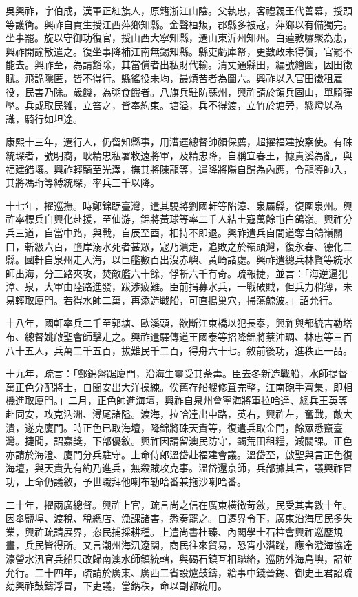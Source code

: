 \begin{pinyinscope}
吳興祚，字伯成，漢軍正紅旗人，原籍浙江山陰。父執忠，客禮親王代善幕，授頭等護衛。興祚自貢生授江西萍鄉知縣。金聲桓叛，郡縣多被寇，萍鄉以有備獨完。坐事罷。旋以守御功復官，授山西大寧知縣，遷山東沂州知州。白蓮教嘯聚為患，興祚開諭散遣之。復坐事降補江南無錫知縣。縣吏虧庫帑，更數政未得償，官罷不能去。興祚至，為請豁除，其當償者出私財代輸。清丈通縣田，編號繪圖，因田徵賦。飛詭隱匿，皆不得行。縣徭役未均，最煩苦者為圖六。興祚以入官田徵租雇役，民害乃除。歲饑，為粥食餓者。八旗兵駐防蘇州，興祚請於領兵固山，單騎彈壓。兵或取民雞，立笞之，皆奉約束。塘溢，兵不得渡，立竹於塘旁，懸燈以為識，騎行如坦途。

康熙十三年，遷行人，仍留知縣事，用漕運總督帥顏保薦，超擢福建按察使。有硃統琛者，號明裔，耿精忠私署敉遠將軍，及精忠降，自稱宜春王，據貴溪為亂，與福建錯壤。興祚輕騎至光澤，撫其將陳龍等，遣降將陽自歸為內應，令龍導師入，其將馮珩等縛統琛，率兵三千以降。

十七年，擢巡撫。時鄭錦踞臺灣，遣其驍將劉國軒等陷漳、泉屬縣，復圍泉州。興祚率標兵自興化赴援，至仙游，錦將黃球等率二千人結土寇萬餘屯白鴿嶺。興祚分兵三道，自當中路，與戰，自辰至酉，相持不即退。興祚遣兵自間道奪白鴿嶺關口，斬級六百，墮岸溺水死者甚眾，寇乃潰走，追敗之於嶺頭灣，復永春、德化二縣。國軒自泉州走入海，以巨艦數百出沒赤嶼、黃崎諸處。興祚遣總兵林賢等統水師出海，分三路夾攻，焚敵艦六十餘，俘斬六千有奇。疏報捷，並言：「海逆逼犯漳、泉，大軍由陸路進發，跋涉疲難。臣前捐募水兵，一戰破賊，但兵力稍薄，未易輕取廈門。若得水師二萬，再添造戰船，可直搗巢穴，掃蕩鯨波。」詔允行。

十八年，國軒率兵二千至郭塘、歐溪頭，欲斷江東橋以犯長泰，興祚與都統吉勒塔布、總督姚啟聖會師擊走之。興祚遣驛傳道王國泰等招降錦將蔡沖琱、林忠等三百八十五人，兵萬二千五百，拔難民千二百，得舟六十七。敘前後功，進秩正一品。

十九年，疏言：「鄭錦盤踞廈門，沿海生靈受其荼毒。臣去冬新造戰船，水師提督萬正色分配將士，自閩安出大洋操練。俟舊存船艘修葺完整，江南砲手齊集，即相機進取廈門。」二月，正色師進海壇，興祚自泉州會寧海將軍拉哈達、總兵王英等赴同安，攻克汭洲、潯尾諸隘。渡海，拉哈達出中路，英右，興祚左，奮戰，敵大潰，遂克廈門。時正色已取海壇，降錦將硃天貴等，復遣兵取金門，餘眾悉竄臺灣。捷聞，詔嘉獎，下部優敘。興祚因請留澳民防守，蠲荒田租糧，減關課。正色亦請於海澄、廈門分兵駐守。上命侍郎溫岱赴福建會議。溫岱至，啟聖與言正色復海壇，與天貴先有約乃進兵，無殺賊攻克事。溫岱還京師，兵部據其言，議興祚冒功，上命仍議敘，予世職拜他喇布勒哈番兼拖沙喇哈番。

二十年，擢兩廣總督。興祚上官，疏言尚之信在廣東橫徵苛斂，民受其害數十年。因舉鹽埠、渡稅、稅總店、漁課諸害，悉奏罷之。自遷界令下，廣東沿海居民多失業，興祚疏請展界，恣民捕採耕種。上遣尚書杜臻、內閣學士石柱會興祚巡歷規畫，兵民皆得所。又言潮州海汛遼闊，商民往來貿易，恐宵小潛蹤，應令澄海協達濠營水汛官兵船只改歸南澳水師鎮統轄，與碣石鎮互相聯絡，巡防外海島嶼，詔並允行。二十四年，疏請於廣東、廣西二省設爐鼓鑄，給事中錢晉錫、御史王君詔疏劾興祚鼓鑄浮冒，下吏議，當鐫秩，命以副都統用。


\end{pinyinscope}
